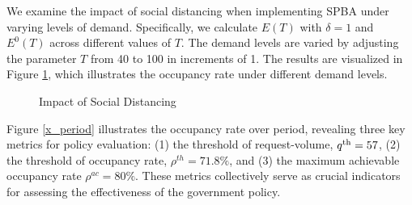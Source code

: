 We examine the impact of social distancing when implementing SPBA under varying levels of demand.  Specifically, we calculate $E(T)$ with $\delta = 1$ and $E^{0}(T)$ across different values of $T$. The demand levels are varied by adjusting the parameter $T$ from 40 to 100 in increments of 1. The results are visualized in Figure \ref{occupancy_rate_demand}, which illustrates the occupancy rate under different demand levels.



\begin{figure}[h]
  \centering
      \caption{Impact of Social Distancing}\label{occupancy_rate_demand}
\end{figure}


Figure \ref{x_period} illustrates the occupancy rate over period, revealing three key metrics for policy evaluation: (1) the threshold of request-volume, ${q}^{\textup{th}} = 57$, (2) the threshold of occupancy rate, $\rho^{th} = 71.8\%$, and (3) the maximum achievable occupancy rate $\rho^{ac} =80\%$. These metrics collectively serve as crucial indicators for assessing the effectiveness of the government policy.


